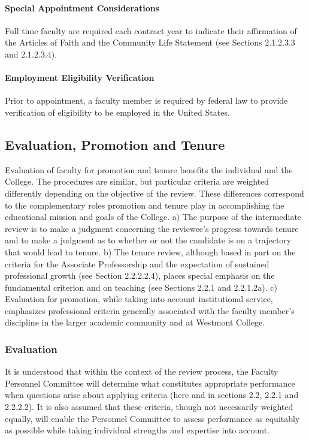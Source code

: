 \documentclass[letterpaper, 11pt]{article}
\begin{document}
			\paragraph{Special Appointment Considerations}
				Full time faculty are required each contract year to indicate their affirmation of the Articles of Faith and the Community Life Statement (see Sections 2.1.2.3.3 and 2.1.2.3.4).
			\paragraph{Employment Eligibility Verification}
				Prior to appointment, a faculty member is required by federal law to provide verification of eligibility to be employed in the United States.
	\subsection{Evaluation, Promotion and Tenure}
		Evaluation of faculty for promotion and tenure benefits the individual and the College. The procedures are similar, but particular criteria are weighted differently depending on the objective of the review.  These differences correspond to the complementary roles promotion and tenure play in accomplishing the educational mission and goals of the College.
		a) The purpose of the intermediate review is to make a judgment concerning the reviewee's progress towards tenure and to make a judgment as to whether or not the candidate is on a trajectory that would lead to tenure.
		b) The tenure review, although based in part on the criteria for the Associate Professorship and the expectation of sustained professional growth (see Section 2.2.2.2.4), places special emphasis on the fundamental criterion and on teaching (see Sections 2.2.1 and 2.2.1.2a).
		c) Evaluation for promotion, while taking into account institutional service, emphasizes professional criteria generally associated with the faculty member's discipline in the larger academic community and at Westmont College.
		\subsubsection{Evaluation}
			It is understood that within the context of the review process, the Faculty Personnel Committee will determine what constitutes appropriate performance when questions arise about applying criteria (here and in sections 2.2, 2.2.1 and 2.2.2.2).  It is also assumed that these criteria, though not necessarily weighted equally, will enable the Personnel Committee to assess performance as equitably as possible while taking individual strengths and expertise into account.
\end{document}
